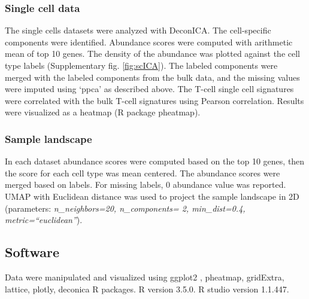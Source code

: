 \documentclass[12pt,]{book}
\theoremstyle{definition}
\theoremstyle{definition}
\theoremstyle{definition}
\theoremstyle{remark}
\begin{document}
\hypertarget{single-cell-data}{%
\subsubsection{Single cell data}\label{single-cell-data}}

The single cells datasets were analyzed with DeconICA. The cell-specific
components were identified. Abundance scores were computed with
arithmetic mean of top 10 genes. The density of the abundance was
plotted against the cell type labels (Supplementary fig.
\ref{fig:scICA}). The labeled components were merged with the labeled
components from the bulk data, and the missing values were imputed using
`ppca' as described above. The T-cell single cell signatures were
correlated with the bulk T-cell signatures using Pearson correlation.
Results were visualized as a heatmap (R package pheatmap).

\hypertarget{sample-landscape}{%
\subsubsection{Sample landscape}\label{sample-landscape}}

In each dataset abundance scores were computed based on the top 10
genes, then the score for each cell type was mean centered. The
abundance scores were merged based on labels. For missing labels, 0
abundance value was reported. UMAP with Euclidean distance was used to
project the sample landscape in 2D (parameters: \emph{n\_neighbors=20,
n\_components= 2, min\_dist=0.4, metric=``euclidean''}).

\hypertarget{software}{%
\subsection{Software}\label{software}}

Data were manipulated and visualized using ggplot2 \citep{ggplot2},
pheatmap\citep{pheatmap}, gridExtra\citep{gridExtra},
lattice\citep{lattice}, plotly\citep{plotly}, deconica
\citep{Czerwinska2018} R packages. R version 3.5.0. R studio version
1.1.447.
\end{document}
